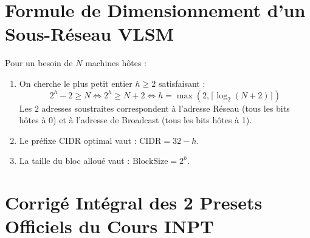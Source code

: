 \documentclass[11pt,a4paper]{report}
\begin{document}
\section{Formule de Dimensionnement d'un Sous-R\'eseau VLSM}
Pour un besoin de $N$ machines h\^otes :
\begin{enumerate}
    \item On cherche le plus petit entier $h \ge 2$ satisfaisant :
    $$2^h - 2 \ge N \iff 2^h \ge N + 2 \iff h = \max\left(2, \lceil \log_2(N + 2) \rceil\right)$$
    Les $2$ adresses soustraites correspondent \`a l'adresse R\'eseau (tous les bits h\^otes \`a 0) et \`a l'adresse de Broadcast (tous les bits h\^otes \`a 1).
    \item Le pr\'efixe CIDR optimal vaut : $\text{CIDR} = 32 - h$.
    \item La taille du bloc allou\'e vaut : $\text{BlockSize} = 2^h$.
\end{enumerate}

\section{Corrig\'e Int\'egral des 2 Presets Officiels du Cours INPT}
\end{document}
